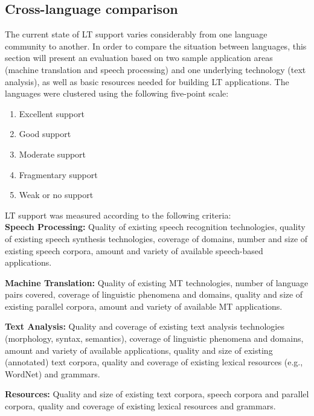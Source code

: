 \begin{multicols}{2}
\subsection{Cross-language comparison}

 The current state of LT support varies considerably from one language community to another. In order to compare the situation between languages, this section will present an evaluation based on two sample application areas (machine translation and speech processing) and one underlying technology (text analysis), as well as basic resources needed for building LT applications. The languages were clustered using the following five-point scale: 

\begin{enumerate}
\item Excellent support
\item Good support
\item Moderate support
\item Fragmentary support
\item Weak or no support
\end{enumerate}

LT support was measured according to the following criteria:\\
\textbf{Speech Processing:} Quality of existing speech recognition technologies, quality of existing speech synthesis technologies, coverage of domains, number and size of existing speech corpora, amount and variety of available speech-based applications.

\textbf{Machine Translation:} Quality of existing MT technologies, number of language pairs covered, coverage of linguistic phenomena and domains, quality and size of existing parallel corpora, amount and variety of available MT applications.

\textbf{Text Analysis:} Quality and coverage of existing text analysis technologies (morphology, syntax, semantics), coverage of linguistic phenomena and domains, amount and variety of available applications, quality and size of existing (annotated) text corpora, quality and coverage of existing lexical resources (e.g., WordNet) and grammars.

\textbf{Resources:} Quality and size of existing text corpora, speech corpora and parallel corpora, quality and coverage of existing lexical resources and grammars.


\end{multicols}
